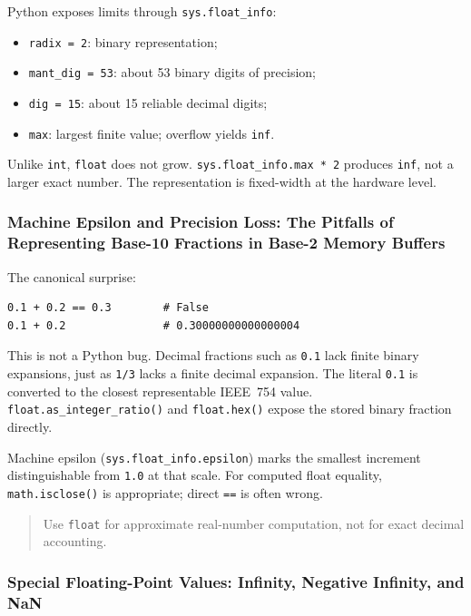 \documentclass[a4paper,twoside]{report}
\begin{document}
Python exposes limits through \texttt{sys.float\_info}:

\begin{itemize}
    \item \texttt{radix = 2}: binary representation;
    \item \texttt{mant\_dig = 53}: about 53 binary digits of precision;
    \item \texttt{dig = 15}: about 15 reliable decimal digits;
    \item \texttt{max}: largest finite value; overflow yields \texttt{inf}.
\end{itemize}

Unlike \texttt{int}, \texttt{float} does not grow. \texttt{sys.float\_info.max * 2} produces \texttt{inf}, not a larger exact number. The representation is fixed-width at the hardware level.

\subsubsection{Machine Epsilon and Precision Loss: The Pitfalls of Representing Base-10 Fractions in Base-2 Memory Buffers}

The canonical surprise:

\begin{verbatim}
0.1 + 0.2 == 0.3        # False
0.1 + 0.2               # 0.30000000000000004
\end{verbatim}

This is not a Python bug. Decimal fractions such as \texttt{0.1} lack finite binary expansions, just as \texttt{1/3} lacks a finite decimal expansion. The literal \texttt{0.1} is converted to the closest representable IEEE~754 value. \texttt{float.as\_integer\_ratio()} and \texttt{float.hex()} expose the stored binary fraction directly.

Machine epsilon (\texttt{sys.float\_info.epsilon}) marks the smallest increment distinguishable from \texttt{1.0} at that scale. For computed float equality, \texttt{math.isclose()} is appropriate; direct \texttt{==} is often wrong.

\begin{quote}
Use \texttt{float} for approximate real-number computation, not for exact decimal accounting.
\end{quote}

\subsubsection{Special Floating-Point Values: Infinity, Negative Infinity, and NaN}
\end{document}
